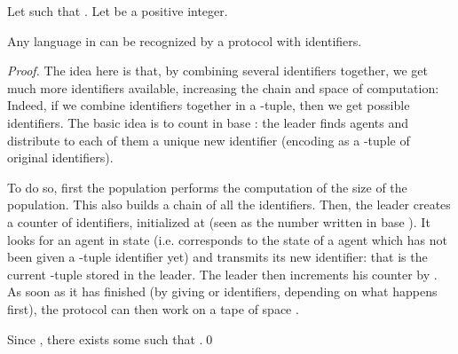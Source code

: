 \documentclass[UKenglish]{llncs}
\newcommand\id{identifier}
\begin{document}
\begin{proposition}\label{prop:truc}
Let  such that .
Let  be a positive integer.

Any language in  can be recognized by a protocol
with  identifiers.
\end{proposition}

\begin{proof}
The idea here is that, by combining several identifiers together, we get much more identifiers available, increasing
the chain and space of computation: Indeed, if we combine  {\id}s together
in a -tuple, then we get  possible identifiers. The basic idea is to
count in base : the leader finds  agents and
distribute to each of them a unique new identifier (encoding as a -tuple of
original identifiers). 

To do so, first the population performs the computation of the size of
the population. This also builds a chain of
all the identifiers. Then, the leader creates a counter of  identifiers, initialized at  (seen as the number
 written in base ). It looks for an agent in state 
(i.e.  corresponds to the state of a agent which has not been given
a -tuple identifier yet) and transmits its new identifier: that is the
current -tuple stored in the leader. The leader then increments his
counter by . As soon as it has finished (by giving  or  identifiers, depending on what happens first),
the protocol can then work on a tape of space .

Since , there exists some  such that .\hfill \qed

 \end{proof}
\end{document}
